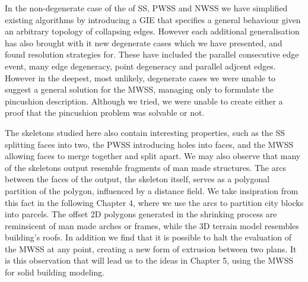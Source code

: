 In the non-degenerate case of the of SS, PWSS and NWSS we have simplified existing algorithms by introducing a GIE that specifies a general behaviour given an arbitrary topology of collapsing edges. However each additional generalisation has also brought with it new degenerate cases which we have presented, and found resolution strategies for. These have included the parallel consecutive edge event, many edge degeneracy, point degeneracy and parallel adjcent edges.
However in the deepest, most unlikely, degenerate cases we were unable to suggest a general solution for the MWSS, managing only to formulate the pincushion description. Although we tried, we were unable to create either a proof that the pincushion problem was solvable or not.

The skeletons studied here also contain interesting properties, such as the SS splitting faces into two, the PWSS introducing holes into faces, and the MWSS allowing faces to merge together and split apart. We may also observe that many of the skeletons output resemble fragments of man made structures. The arcs between the faces of the output, the skeleton itself, serves as a polygonal partition of the polygon, influenced by a distance field. We take insipration from this fact in the following Chapter 4, where we use the arcs to partition city blocks into parcels. The offset 2D polygons generated in the shrinking process are reminsicent of man made arches or frames, while the 3D terrain model resembles building's roofs. In addition we find that it is possible to halt the evaluation of the MWSS at any point, creating a new form of extrusion between two plans. It is this observation that will lead us to the ideas in Chapter 5, using the MWSS for solid building modeling.








%  

